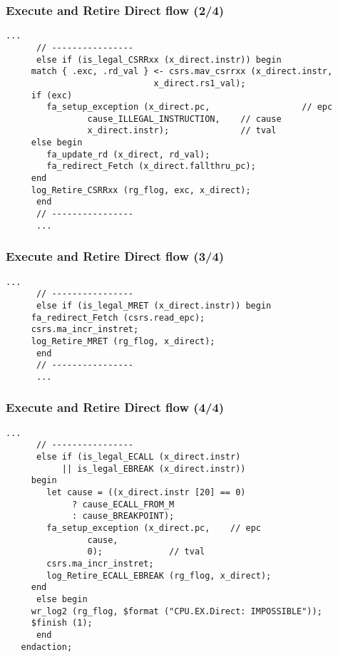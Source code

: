 \begin{frame}[fragile]
\frametitle{Execute and Retire Direct flow (2/4)}

\footnotesize

\begin{minipage}{0.725\textwidth}
\begin{Verbatim}[frame=single, label=From src\_Drum/CPU.bsv]
      ...
      // ----------------
      else if (is_legal_CSRRxx (x_direct.instr)) begin
	 match { .exc, .rd_val } <- csrs.mav_csrrxx (x_direct.instr,
						     x_direct.rs1_val);
	 if (exc)
	    fa_setup_exception (x_direct.pc,                  // epc
				cause_ILLEGAL_INSTRUCTION,    // cause
				x_direct.instr);              // tval
	 else begin
	    fa_update_rd (x_direct, rd_val);
	    fa_redirect_Fetch (x_direct.fallthru_pc);
	 end
	 log_Retire_CSRRxx (rg_flog, exc, x_direct);
      end
      // ----------------
      ...
\end{Verbatim}
\end{minipage}

\end{frame}


\begin{frame}[fragile]
\frametitle{Execute and Retire Direct flow (3/4)}

\footnotesize

\begin{minipage}{0.725\textwidth}
\begin{Verbatim}[frame=single, label=From src\_Drum/CPU.bsv]
      ...
      // ----------------
      else if (is_legal_MRET (x_direct.instr)) begin
	 fa_redirect_Fetch (csrs.read_epc);
	 csrs.ma_incr_instret;
	 log_Retire_MRET (rg_flog, x_direct);
      end
      // ----------------
      ...
\end{Verbatim}
\end{minipage}

\end{frame}


\begin{frame}[fragile]
\frametitle{Execute and Retire Direct flow (4/4)}

\footnotesize

\begin{minipage}{0.725\textwidth}
\begin{Verbatim}[frame=single, label=From src\_Drum/CPU.bsv]
      ...
      // ----------------
      else if (is_legal_ECALL (x_direct.instr)
	       || is_legal_EBREAK (x_direct.instr))
	 begin
	    let cause = ((x_direct.instr [20] == 0)
			 ? cause_ECALL_FROM_M
			 : cause_BREAKPOINT);
	    fa_setup_exception (x_direct.pc,    // epc
				cause,
				0);             // tval
	    csrs.ma_incr_instret;
	    log_Retire_ECALL_EBREAK (rg_flog, x_direct);
	 end
      else begin
	 wr_log2 (rg_flog, $format ("CPU.EX.Direct: IMPOSSIBLE"));
	 $finish (1);
      end
   endaction;
\end{Verbatim}
\end{minipage}

\end{frame}

